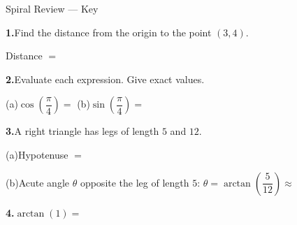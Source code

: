 \documentclass[10pt]{article}
\begin{document}
\namedateperiod

\vspace{0.10in}

\begin{notesbox}{Spiral Review --- Key}

\textbf{1.}\quad Find the distance from the origin to the point $(3, 4)$.

\vspace{4pt}
Distance $= $ 

\vspace{0.14in}
\textbf{2.}\quad Evaluate each expression. Give exact values.

\vspace{4pt}
(a)\quad $\cos\!\left(\dfrac{\pi}{4}\right) = $ 
\hspace{1.5cm}
(b)\quad $\sin\!\left(\dfrac{\pi}{4}\right) = $ 

\vspace{0.14in}
\textbf{3.}\quad A right triangle has legs of length $5$ and $12$.

\vspace{4pt}
(a)\quad Hypotenuse $= $ 

\vspace{4pt}
(b)\quad Acute angle $\theta$ opposite the leg of length $5$:\quad
$\theta = \arctan\!\left(\dfrac{5}{12}\right) \approx$ 

\vspace{0.14in}
\textbf{4.}\quad $\arctan(1) = $ 

\end{notesbox}
\end{document}
